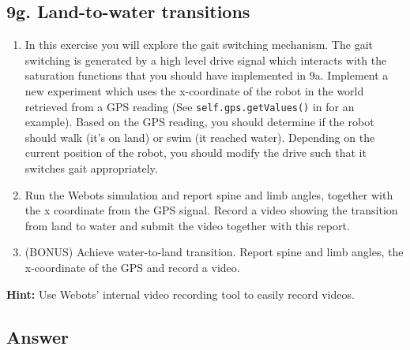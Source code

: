 \documentclass{cmc}
\begin{document}
\subsection*{9g. Land-to-water transitions}

\begin{enumerate}
\item In this exercise you will explore the gait switching mechanism. The gait
  switching is generated by a high level drive signal which interacts with the
  saturation functions that you should have implemented in 9a. Implement a new
  experiment which uses the x-coordinate of the robot in the world retrieved
  from a GPS reading (See \texttt{self.gps.getValues()} in
   for an example). Based on the GPS reading,
  you should determine if the robot should walk (it’s on land) or swim (it
  reached water). Depending on the current position of the robot, you should
  modify the drive such that it switches gait appropriately.
\item Run the Webots simulation and report spine and limb angles, together with
  the x coordinate from the GPS signal. Record a video showing the transition
  from land to water and submit the video together with this report.

\item (BONUS) Achieve water-to-land transition. Report spine and limb angles,
  the x-coordinate of the GPS and record a video.
\end{enumerate}


\textbf{Hint:} Use Webots’ internal video recording tool to easily record
videos.

\subsection*{Answer}
\end{document}
